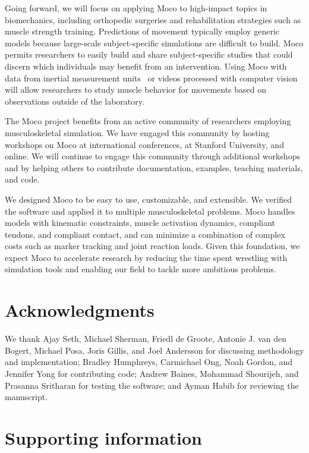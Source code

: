 \documentclass[10pt,letterpaper]{article}
\begin{document}
Going forward, we will focus on applying Moco to high-impact topics in biomechanics, including orthopedic surgeries and rehabilitation strategies such as muscle strength training. Predictions of movement typically employ generic models because large-scale subject-specific simulations are difficult to build. Moco permits researchers to easily build and share subject-specific studies that could discern which individuals may benefit from an intervention. Using Moco with data from inertial measurement units~\cite{Dorschky:2019} or videos processed with computer vision~\cite{OpenPose:2019} will allow researchers to study muscle behavior for movements based on observations outside of the laboratory.

The Moco project benefits from an active community of researchers employing musculoskeletal simulation. We have engaged this community by hosting workshops on Moco at international conferences, at Stanford University, and online. We will continue to engage this community through additional workshops and by helping others to contribute documentation, examples, teaching materials, and code.

We designed Moco to be easy to use, customizable, and extensible. We verified the software and applied it to multiple musculoskeletal problems. Moco handles models with kinematic constraints, muscle activation dynamics, compliant tendons, and compliant contact, and can minimize a combination of complex costs such as marker tracking and joint reaction loads. Given this foundation, we expect Moco to accelerate research by reducing the time spent wrestling with simulation tools and enabling our field to tackle more ambitious problems.

\section*{Acknowledgments}

We thank Ajay Seth, Michael Sherman, Friedl de Groote, Antonie J. van den Bogert, Michael Posa, Joris Gillis, and Joel Andersson for discussing methodology and implementation; Bradley Humphreys, Carmichael Ong, Noah Gordon, and Jennifer Yong for contributing code; Andrew Baines, Mohammad Shourijeh, and Prasanna Sritharan for testing the software; and Ayman Habib for reviewing the manuscript.

\section*{Supporting information}
\end{document}
